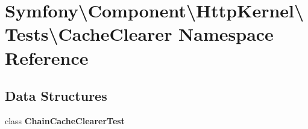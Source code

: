 \section{Symfony\textbackslash{}Component\textbackslash{}Http\+Kernel\textbackslash{}Tests\textbackslash{}Cache\+Clearer Namespace Reference}
\label{namespace_symfony_1_1_component_1_1_http_kernel_1_1_tests_1_1_cache_clearer}
\subsection*{Data Structures}
\begin{DoxyCompactItemize}
\item 
class {\bf Chain\+Cache\+Clearer\+Test}
\end{DoxyCompactItemize}
